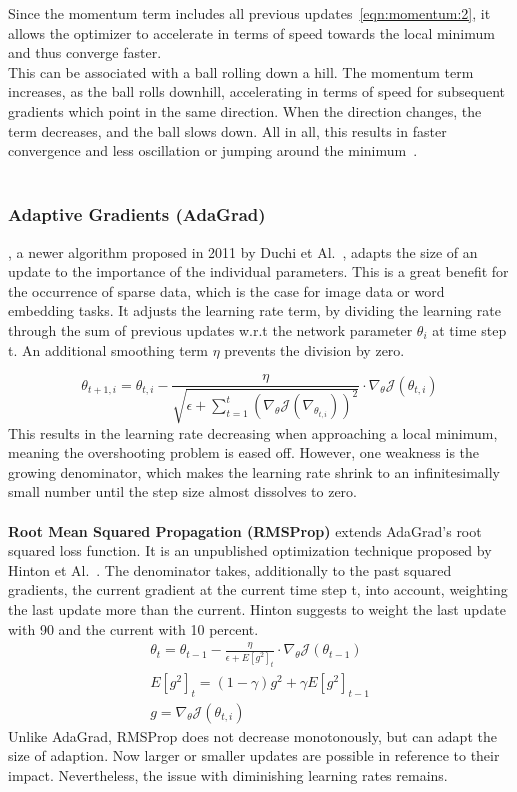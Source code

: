 Since the momentum term includes all previous updates~\ref{eqn:momentum:2}, it allows the optimizer to accelerate in terms of speed towards
the local minimum and thus converge faster.\\
This can be associated with a ball rolling down a hill.
The momentum term increases, as the ball rolls downhill, accelerating in terms of speed for subsequent gradients
which point in the same direction.
When the direction changes, the term decreases, and the ball slows down.
All in all, this results in faster convergence and less oscillation or jumping around the minimum~\cite{optimizersoverview}.
\\\mbox{}\\
\subsubsection{Adaptive Gradients (AdaGrad)}, a newer algorithm proposed in 2011 by Duchi et Al.~\cite{adagrad},
adapts the size of an update to the importance of the individual parameters.
This is a great benefit for the occurrence of sparse data, which is the case for image data or word embedding tasks.
It adjusts the learning rate term, by dividing the learning rate through the sum
of previous updates w.r.t the network parameter $\theta_i$ at time step t.
An additional smoothing term $\eta$ prevents the division by zero.

\begin{equation}
    \theta_{t+1,i} = \theta_{t,i} - \frac{\eta}{\sqrt{\epsilon+\sum_{t=1}^{t}(\nabla_\theta\mathcal{J}(\nabla_{\theta_{t,i}}))^2}} \cdot \nabla_\theta\mathcal{J}(\theta_{t,i})
    \label{eqn:adagrad}
\end{equation}
This results in the learning rate decreasing when approaching a local minimum, meaning the overshooting problem is eased off.
However, one weakness is the growing denominator, which makes the learning rate shrink to an infinitesimally small number until the step
size almost dissolves to zero.
\\\mbox{}\\
\textbf{Root Mean Squared Propagation (RMSProp)} extends AdaGrad's root squared loss function.
It is an unpublished optimization technique proposed by Hinton et Al.~\cite{rmsprop}.
The denominator takes, additionally to the past squared gradients, the current gradient at the current time step t,
into account, weighting the last update more than the current.
Hinton suggests to weight the last update with 90 and the current with 10 percent.
\begin{align}
    \theta_{t} = \theta_{t-1} - \frac{\eta}{\epsilon+E[g^2]_t} \cdot \nabla_\theta\mathcal{J}(\theta_{t-1})\label{eqn:rmsprop:1}\\
    E[g^2]_t = (1-\gamma)g^2+\gamma E[g^2]_{t-1}\label{eqn:rmsprop:2}\\
    g = \nabla_\theta\mathcal{J}(\theta_{t,i})\label{eqn:rmsprop:3}
\end{align}
Unlike AdaGrad, RMSProp does not decrease monotonously, but can adapt the size of adaption.
Now larger or smaller updates are possible in reference to their impact.
Nevertheless, the issue with diminishing learning rates remains.
\\\mbox{}\\
